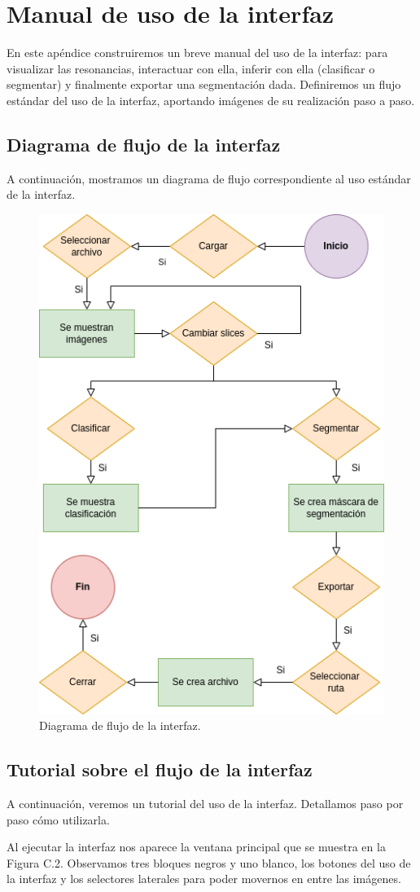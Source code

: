 \chapter{Manual de uso de la interfaz}

En este apéndice construiremos un breve manual del uso de la interfaz: para visualizar las resonancias, interactuar con ella,  inferir con ella (clasificar o segmentar) y finalmente exportar una segmentación dada. Definiremos un flujo estándar del uso de la interfaz, aportando imágenes de su realización paso a paso.

\section{Diagrama de flujo de la interfaz}

A continuación, mostramos un diagrama de flujo correspondiente al uso estándar de la interfaz.

\begin{figure}[H]
	\centering
	\includegraphics[width=0.4\linewidth]{imagenes/flujointerfaz.png}
	\caption{Diagrama de flujo de la interfaz.}
\end{figure}

\section{Tutorial sobre el flujo de la interfaz}

A continuación, veremos un tutorial del uso de la interfaz. Detallamos paso por paso cómo utilizarla. 

Al ejecutar la interfaz nos aparece la ventana principal que se muestra en la Figura C.2. Observamos tres bloques negros y uno blanco, los botones del uso de la interfaz y los selectores laterales para poder movernos en entre las imágenes.

